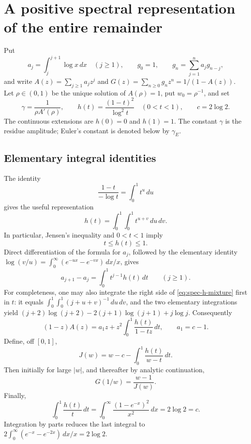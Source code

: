 
\section{A positive spectral representation of the entire remainder}
\label{sec:spectral-notes}

Put
\[
 a_j=\int_j^{j+1}\log x\,dx\quad(j\ge1),\qquad
 g_0=1,\qquad g_n=\sum_{j=1}^n a_jg_{n-j},
\]
and write $A(z)=\sum_{j\ge1}a_jz^j$ and
$G(z)=\sum_{n\ge0}g_nz^n=1/(1-A(z))$.  Let $\rho\in(0,1)$
be the unique solution of $A(\rho)=1$, put $w_0=\rho^{-1}$, and set
\[
 \gamma=\frac1{\rho A'(\rho)},\qquad
 h(t)=\frac{(1-t)^2}{\log^2t}\quad(0<t<1),\qquad c=2\log2.
\]
The continuous extensions are $h(0)=0$ and $h(1)=1$.  The constant
$\gamma$ is the residue amplitude; Euler's constant is denoted below
by $\gamma_{\!E}$.

\subsection{Elementary integral identities}

The identity
\[
 \frac{1-t}{-\log t}=\int_0^1t^u\,du
\]
gives the useful representation
\begin{equation}
 h(t)=\int_0^1\int_0^1t^{u+v}\,du\,dv.
 \label{eq:spec-h-mixture}
\end{equation}
In particular, Jensen's inequality and $0<t<1$ imply
\begin{equation}
 t\le h(t)\le1.
 \label{eq:spec-h-bounds}
\end{equation}
Direct differentiation of the formula for $a_j$, followed by the
elementary identity $\log(v/u)=\int_0^\infty(e^{-ux}-e^{-vx})\,dx/x$,
gives
\begin{equation}
 a_{j+1}-a_j=\int_0^1t^{j-1}h(t)\,dt\qquad(j\ge1).
 \label{eq:spec-differences}
\end{equation}
For completeness, one may also integrate the right side of
\eqref{eq:spec-h-mixture} first in $t$: it equals
$\int_0^1\int_0^1(j+u+v)^{-1}\,du\,dv$, and the two elementary
integrations yield
$(j+2)\log(j+2)-2(j+1)\log(j+1)+j\log j$.
Consequently
\[
 (1-z)A(z)=a_1z+z^2\int_0^1\frac{h(t)}{1-tz}\,dt,
 \qquad a_1=c-1.
\]
Define, off $[0,1]$,
\begin{equation}
 J(w)=w-c-\int_0^1\frac{h(t)}{w-t}\,dt.
 \label{eq:spec-J}
\end{equation}
Then initially for large $|w|$, and thereafter by analytic continuation,
\begin{equation}
 G(1/w)=\frac{w-1}{J(w)}.
 \label{eq:spec-G-J}
\end{equation}
Finally,
\begin{equation}
 \int_0^1\frac{h(t)}t\,dt
 =\int_0^\infty\frac{(1-e^{-x})^2}{x^2}\,dx=2\log2=c.
 \label{eq:spec-zeroidentity}
\end{equation}
Integration by parts reduces the last integral to
$2\int_0^\infty(e^{-x}-e^{-2x})\,dx/x=2\log2$.

